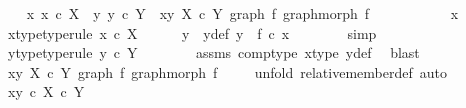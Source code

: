 \begin{isabellebody}
\ \ \isamarkupfalse%
\ {\isachardoublequoteopen}{\isasymAnd}x{\isachardot}{\kern0pt}\ x\ {\isasymin}\isactrlsub c\ X\ {\isasymLongrightarrow}\ {\isasymexists}y{\isachardot}{\kern0pt}\ y\ {\isasymin}\isactrlsub c\ Y\ {\isasymand}\ {\isasymlangle}x{\isacharcomma}{\kern0pt}y{\isasymrangle}\ {\isasymin}\isactrlbsub X\ {\isasymtimes}\isactrlsub c\ Y\isactrlesub \ {\isacharparenleft}{\kern0pt}graph\ f{\isacharcomma}{\kern0pt}\ graph{\isacharunderscore}{\kern0pt}morph\ f{\isacharparenright}{\kern0pt}{\isachardoublequoteclose}\isanewline
\ \ \isamarkupfalse%
\ {\isacharminus}{\kern0pt}\ \isanewline
\ \ \ \ \isamarkupfalse%
\ x\ \isanewline
\ \ \ \ \isamarkupfalse%
\ x{\isacharunderscore}{\kern0pt}type{\isacharbrackleft}{\kern0pt}type{\isacharunderscore}{\kern0pt}rule{\isacharbrackright}{\kern0pt}{\isacharcolon}{\kern0pt}\ {\isachardoublequoteopen}x\ {\isasymin}\isactrlsub c\ X{\isachardoublequoteclose}\isanewline
\ \ \ \ \isamarkupfalse%
\ y\ \ y{\isacharunderscore}{\kern0pt}def{\isacharcolon}{\kern0pt}\ {\isachardoublequoteopen}y\ {\isacharequal}{\kern0pt}\ f\ {\isasymcirc}\isactrlsub c\ x{\isachardoublequoteclose}\isanewline
\ \ \ \ \ \ \isamarkupfalse%
\ simp\isanewline
\ \ \ \ \isamarkupfalse%
\ \isamarkupfalse%
\ y{\isacharunderscore}{\kern0pt}type{\isacharbrackleft}{\kern0pt}type{\isacharunderscore}{\kern0pt}rule{\isacharbrackright}{\kern0pt}{\isacharcolon}{\kern0pt}\ {\isachardoublequoteopen}y\ {\isasymin}\isactrlsub c\ Y{\isachardoublequoteclose}\isanewline
\ \ \ \ \ \ \isamarkupfalse%
\ assms\ comp{\isacharunderscore}{\kern0pt}type\ x{\isacharunderscore}{\kern0pt}type\ y{\isacharunderscore}{\kern0pt}def\ \isamarkupfalse%
\ blast\isanewline
\isanewline
\ \ \ \ \isamarkupfalse%
\ {\isachardoublequoteopen}{\isasymlangle}x{\isacharcomma}{\kern0pt}y{\isasymrangle}\ {\isasymin}\isactrlbsub X\ {\isasymtimes}\isactrlsub c\ Y\isactrlesub \ {\isacharparenleft}{\kern0pt}graph\ f{\isacharcomma}{\kern0pt}\ graph{\isacharunderscore}{\kern0pt}morph\ f{\isacharparenright}{\kern0pt}{\isachardoublequoteclose}\isanewline
\ \ \ \ \isamarkupfalse%
{\isacharparenleft}{\kern0pt}unfold\ relative{\isacharunderscore}{\kern0pt}member{\isacharunderscore}{\kern0pt}def{\isacharcomma}{\kern0pt}\ auto{\isacharparenright}{\kern0pt}\isanewline
\ \ \ \ \ \ \isamarkupfalse%
\ {\isachardoublequoteopen}{\isasymlangle}x{\isacharcomma}{\kern0pt}y{\isasymrangle}\ {\isasymin}\isactrlsub c\ X\ {\isasymtimes}\isactrlsub c\ Y{\isachardoublequoteclose}\isanewline

\end{isabellebody}
